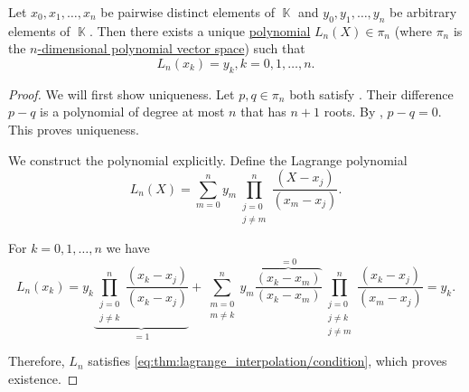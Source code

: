 \begin{theorem}\label{thm:lagrange_interpolation}
  Let \( x_0, x_1, \ldots, x_n \) be pairwise distinct elements of \( \BbbK \) and \( y_0, y_1, \ldots, y_n \) be arbitrary elements of \( \BbbK \). Then there exists a unique \hyperref[def:polynomial_semiring]{polynomial} \( L_n(X) \in \pi_n \) (where \( \pi_n \) is the \hyperref[def:polynomial_semiring_free_module]{\( n \)-dimensional polynomial vector space}) such that
  \begin{equation}\label{eq:thm:lagrange_interpolation/condition}
    L_n(x_k) = y_k, k = 0, 1, \ldots, n.
  \end{equation}
\end{theorem}
\begin{proof}
  We will first show uniqueness. Let \( p, q \in \pi_n \) both satisfy . Their difference \( p - q \) is a polynomial of degree at most \( n \) that has \( n + 1 \) roots. By , \( p - q = 0 \). This proves uniqueness.

  We construct the polynomial explicitly. Define the Lagrange polynomial
  \begin{equation*}
    L_n(X) = \sum_{m=0}^n y_m \prod_{\substack{j = 0 \\ j \neq m}}^n \frac {(X - x_j)} {(x_m - x_j)}.
  \end{equation*}

  For \( k = 0, 1, \ldots, n \) we have
  \begin{equation*}
    L_n(x_k) = y_k \underbrace{\prod_{\substack{j = 0 \\ j \neq k}}^n \frac {(x_k - x_j)} {(x_k - x_j)}}_{=1} + \sum_{\substack{m = 0 \\ m \neq k}}^n y_m \overbrace{\frac{(x_k - x_m)}{(x_k - x_m)}}^{=0} \prod_{\substack{j = 0 \\ j \neq k \\ j \neq m}}^n \frac {(x_k - x_j)} {(x_m - x_j)} = y_k.
  \end{equation*}

  Therefore, \( L_n \) satisfies \eqref{eq:thm:lagrange_interpolation/condition}, which proves existence.
\end{proof}
